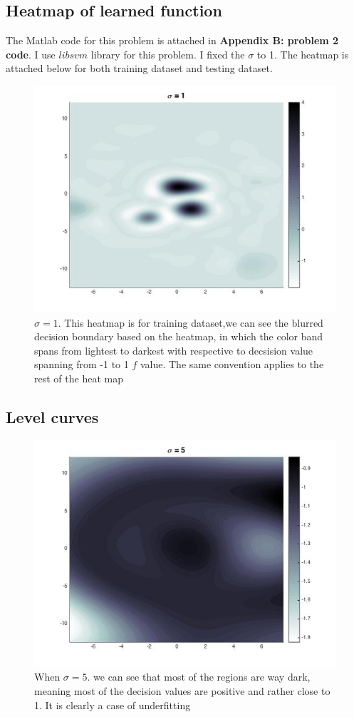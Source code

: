 \documentclass[twoside]{article}
\theoremstyle{definition}
\theoremstyle{definition}
\theoremstyle{remark}
\begin{document}
\subsection{Heatmap of learned function}
The Matlab code for this problem is attached in \textbf{Appendix B: problem 2 code}. I use $libsvm$ library for this problem. I fixed the $\sigma$ to 1. The heatmap is attached below for both training dataset and testing dataset.
  
\begin{figure}[H]
\centering
\includegraphics[width=120mm]{sigma_1.jpg}
\caption{ $\sigma = 1$. This heatmap is for training dataset,we can see the blurred decision boundary based on the heatmap, in which the color band spans from lightest to darkest with respective to decsision value spanning from -1 to 1 $f$ value. The same convention applies to the rest of the heat map\label{problem2Pic1}}
\end{figure}

\subsection{Level curves}
\begin{figure}[H]
\centering
\includegraphics[width=120mm]{sigma_5.jpg}
\caption{ When $\sigma = 5$. we can see that most of the regions are way dark, meaning most of the decision values are positive and rather close to 1. It is clearly a case of underfitting \label{problem2Pic2}}
\end{figure}
\end{document}
